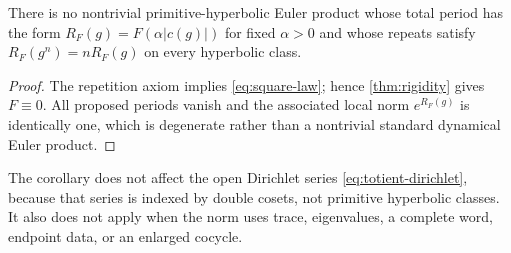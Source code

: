 \begin{corollary}\label{cor:euler}
There is no nontrivial primitive-hyperbolic Euler product whose total period
has the form $R_F(g)=F(\alpha|c(g)|)$ for fixed $\alpha>0$ and whose repeats
satisfy $R_F(g^n)=nR_F(g)$ on every hyperbolic class.
\end{corollary}

\begin{proof}
The repetition axiom implies \eqref{eq:square-law}; hence
\cref{thm:rigidity} gives $F\equiv0$.  All proposed periods vanish and the
associated local norm $e^{R_F(g)}$ is identically one, which is degenerate
rather than a nontrivial standard dynamical Euler product.
\end{proof}

The corollary does not affect the open Dirichlet series
\eqref{eq:totient-dirichlet}, because that series is indexed by double cosets,
not primitive hyperbolic classes.  It also does not apply when the norm uses
trace, eigenvalues, a complete word, endpoint data, or an enlarged cocycle.
